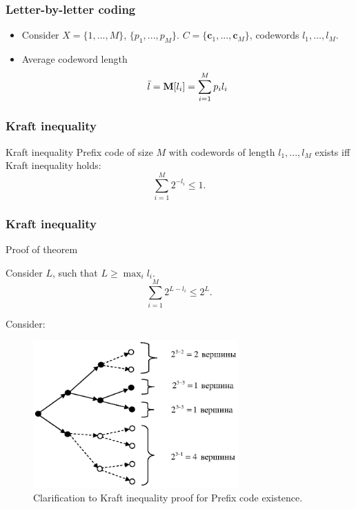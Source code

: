 \documentclass[14pt]{beamer}
\renewcommand{\vec}[1]{\ensuremath{\boldsymbol{#1}}}
\begin{document}
\begin{frame}
\frametitle{Letter-by-letter coding}
\begin{itemize}    

    \item Consider $X = \{1,...,M\}$, $\{p_1 ,...,p_M \}$.
    $C = \{\vec c_1 ,...,\vec c_M \}$, codewords $l_1,\dots,l_M$.
    
    \item  Average codeword length
    \[
    \bar {l} = {\rm {\bf M}}[l_i ] = \sum\limits_{i = 1}^M {p_i l_i } 
    \]

\end{itemize}
\end{frame}


\begin{frame}
\frametitle{Kraft inequality}

    \begin{theorem} {Kraft inequality}
    \label{Kraft_ineq}
    Prefix code of size $M$ with codewords of length $l_1 ,...,l_M $ exists iff Kraft inequality holds:
    \begin{equation}
    \label{Kraft} \sum\limits_{i = 1}^M {2^{ - l_i } \le 1} .
    \end{equation}
    \end{theorem}
\end{frame}


\begin{frame}
\frametitle{Kraft inequality}
Proof of theorem
\begin{itemize}    
\small{

    \item Consider $L$, such that $L \ge \max _i l_i $. 
    \[
    \sum\limits_{i = 1}^M {2^{L - l_i } \le 2^L} .
    \]
    
    \item Consider:
    \begin{figure}[ht]
    \begin{minipage}{1.0\linewidth}
    \includegraphics[width=0.7\textwidth]{fig2_2.eps}
    \caption{Clarification to Kraft inequality proof for Prefix code existence.} \label{Kraft_nec}
    \end{minipage}
    \end{figure}
    
}
\end{itemize}
\end{frame}
\end{document}
